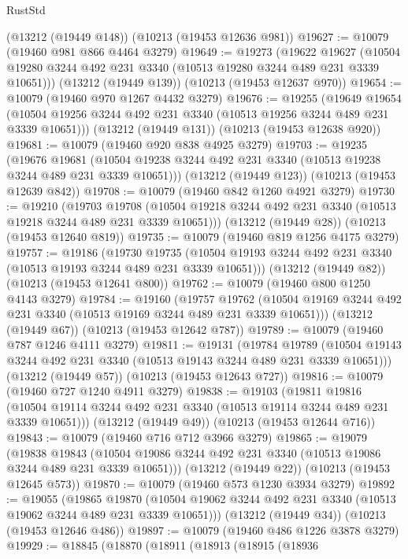\begin{lexlean}{RustStd}
\begin{coremodule}
{\begin{coremodule}
{{{{{{{{{{{{{{{{{{{{{{{{{{    (@13212 (@19449 @148))
    (@10213 (@19453 @12636 @981))
@19627 := @10079 (@19460 @981 @866 @4464 @3279)
@19649 := @19273
    (@19622
      @19627
      (@10504 @19280 @3244 @492 @231 @3340 (@10513 @19280 @3244 @489 @231 @3339 @10651)))
    (@13212 (@19449 @139))
    (@10213 (@19453 @12637 @970))
@19654 := @10079 (@19460 @970 @1267 @4432 @3279)
@19676 := @19255
    (@19649
      @19654
      (@10504 @19256 @3244 @492 @231 @3340 (@10513 @19256 @3244 @489 @231 @3339 @10651)))
    (@13212 (@19449 @131))
    (@10213 (@19453 @12638 @920))
@19681 := @10079 (@19460 @920 @838 @4925 @3279)
@19703 := @19235
    (@19676
      @19681
      (@10504 @19238 @3244 @492 @231 @3340 (@10513 @19238 @3244 @489 @231 @3339 @10651)))
    (@13212 (@19449 @123))
    (@10213 (@19453 @12639 @842))
@19708 := @10079 (@19460 @842 @1260 @4921 @3279)
@19730 := @19210
    (@19703
      @19708
      (@10504 @19218 @3244 @492 @231 @3340 (@10513 @19218 @3244 @489 @231 @3339 @10651)))
    (@13212 (@19449 @28))
    (@10213 (@19453 @12640 @819))
@19735 := @10079 (@19460 @819 @1256 @4175 @3279)
@19757 := @19186
    (@19730
      @19735
      (@10504 @19193 @3244 @492 @231 @3340 (@10513 @19193 @3244 @489 @231 @3339 @10651)))
    (@13212 (@19449 @82))
    (@10213 (@19453 @12641 @800))
@19762 := @10079 (@19460 @800 @1250 @4143 @3279)
@19784 := @19160
    (@19757
      @19762
      (@10504 @19169 @3244 @492 @231 @3340 (@10513 @19169 @3244 @489 @231 @3339 @10651)))
    (@13212 (@19449 @67))
    (@10213 (@19453 @12642 @787))
@19789 := @10079 (@19460 @787 @1246 @4111 @3279)
@19811 := @19131
    (@19784
      @19789
      (@10504 @19143 @3244 @492 @231 @3340 (@10513 @19143 @3244 @489 @231 @3339 @10651)))
    (@13212 (@19449 @57))
    (@10213 (@19453 @12643 @727))
@19816 := @10079 (@19460 @727 @1240 @4911 @3279)
@19838 := @19103
    (@19811
      @19816
      (@10504 @19114 @3244 @492 @231 @3340 (@10513 @19114 @3244 @489 @231 @3339 @10651)))
    (@13212 (@19449 @49))
    (@10213 (@19453 @12644 @716))
@19843 := @10079 (@19460 @716 @712 @3966 @3279)
@19865 := @19079
    (@19838
      @19843
      (@10504 @19086 @3244 @492 @231 @3340 (@10513 @19086 @3244 @489 @231 @3339 @10651)))
    (@13212 (@19449 @22))
    (@10213 (@19453 @12645 @573))
@19870 := @10079 (@19460 @573 @1230 @3934 @3279)
@19892 := @19055
    (@19865
      @19870
      (@10504 @19062 @3244 @492 @231 @3340 (@10513 @19062 @3244 @489 @231 @3339 @10651)))
    (@13212 (@19449 @34))
    (@10213 (@19453 @12646 @486))
@19897 := @10079 (@19460 @486 @1226 @3878 @3279)
@19929 := @18845
    (@18870
      (@18911
        (@18913
          (@18915
            (@18936
}}}}}}}}}}}}}}}}}}}}}}}}}}
\end{coremodule}}
\end{coremodule}
\end{lexlean}
